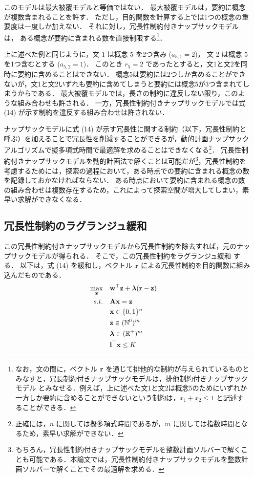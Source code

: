 \documentclass[japanese]{jnlp_1.4}
\begin{document}
このモデルは最大被覆モデルと等価ではない．
最大被覆モデルは，要約に概念が複数含まれることを許す．
ただし，目的関数を計算する上では1つの概念の重要度は一度しか加えない．
それに対し，冗長性制約付きナップサックモデルは，
\pagebreak
ある概念が要約に含まれる数を直接制限する\footnote{なお，文の間に，ベクトル $ {\bf r } $ を通じて排他的な制約が与えられているものとみなすと，冗長制約付きナップサックモデルは，排他制約付きナップサックモデル \cite{yamada02} とみなせる．例えば，上に述べた文1と文2は概念5のためにいずれか一方しか要約に含めることができないという制約は，$ x_{1} + x_{2} \leq 1 $ と記述することができる．}．

上に述べた例と同じように，文 $ 1 $ は概念 $ 5 $ を2つ含み ($ a_{5,1} = 2 $)，
文 $ 2 $ は概念 $ 5 $ を1つ含むとする ($ a_{5,2} = 1 $)．
このとき $ r_{5} = 2 $ であったとすると，文1と文2を同時に要約に含めることはできない．
概念5は要約には2つしか含めることができないが，文1と文2いずれも要約に含めてしまうと要約には概念5が3つ含まれてしまうからである．
最大被覆モデルでは，長さの制約に違反しない限り，このような組み合わせも許される．
一方，冗長性制約付きナップサックモデルでは式 (14) が示す制約を違反する組み合わせは許されない．


ナップサックモデルに式 (14) が示す冗長性に関する制約（以下，冗長性制約と呼ぶ）を加えることで冗長性を削減することができるが，動的計画ナップサックアルゴリズムで擬多項式時間で最適解を求めることはできなくなる\footnote{正確には，$ n $ に関しては擬多項式時間であるが，$ m $ に関しては指数時間となるため，素早い求解ができない．}．
冗長性制約付きナップサックモデルを動的計画法で解くことは可能だが\footnote{もちろん，冗長性制約付きナップサックモデルを整数計画ソルバーで解くことも可能である．本論文では，冗長性制約付きナップサックモデルを整数計画ソルバーで解くことでその最適解を求める．}，冗長性制約を考慮するためには，探索の過程において，ある時点での要約に含まれる概念の数を記録しておかなければならない．
ある時点において要約に含まれる概念の数の組み合わせは複数存在するため，これによって探索空間が増大してしまい，素早い求解ができなくなる．



\subsection{冗長性制約のラグランジュ緩和}

この冗長性制約付きナップサックモデルから冗長性制約を除去すれば，元のナップサックモデルが得られる．
そこで，この冗長性制約をラグランジュ緩和 \cite{korte08} する．
以下は，式 (14) を緩和し，ベクトル $ {\bf r} $ による冗長性制約を目的関数に組み込んだものである．
\begin{align}
\max_{{\bf z}} & \quad {\bf w}^{\top} {\bf z} + \mbox{\boldmath $\lambda$}({\bf r} - {\bf z})  \\
s.t. & \quad {\bf Ax} = {\bf z} \\
& \quad {\bf x} \in \{0, 1\}^{n} \\
& \quad {\bf z} \in ( \mathbb{N}^{0} )^{m} \\
& \quad \boldsymbol{\lambda} \in ( \mathbb{R}^{+} )^{m} \\
& \quad {\bf l}^{\top} {\bf x} \leq K&
\end{align}
\end{document}
